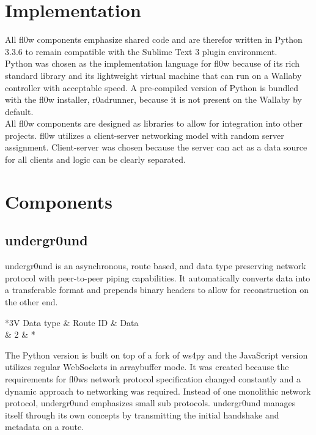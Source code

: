 \documentclass[conference,a4paper]{IEEEtran}
\begin{document}
\section{Implementation}
All fl0w\cite{fl0w:Philip Trauner} components emphasize shared code and are therefor written in Python\cite{Python:Python Foundation} 3.3.6 to remain compatible with the Sublime Text 3\cite{Sublime Text 3:Sublime HQ} plugin environment. \\Python was chosen as the implementation language for fl0w because of its rich standard library and its lightweight virtual machine that can run on a Wallaby\cite{Wallaby Controller:KIPR} controller with acceptable speed. A pre-compiled version of Python is bundled with the fl0w installer, r0adrunner, because it is not present on the Wallaby by default. \\All fl0w components are designed as libraries to allow for integration into other projects. fl0w utilizes a client-server networking model with random server assignment. Client-server was chosen because the server can act as a data source for all clients and logic can be clearly separated.

\section{Components}

\subsection{undergr0und}
undergr0und\cite{undergr0und:Philip Trauner} is an asynchronous, route based, and data type preserving network protocol with peer-to-peer piping capabilities.
It automatically converts data into a transferable format and prepends binary headers to allow for reconstruction on the other end.

\begin{table}[H]
\caption{The binary encoding of messages in undergr0und (in bytes)}
\centering
	\begin{tabular}{*{3}{V}}
		Data type & Route ID & Data \\  & 2 & * \\
	\end{tabular}
\label{fig:undergr0und_header}
\end{table}


The Python\cite{Python:Python Foundation} version is built on top of a fork of ws4py\cite{ws4py:Philip Trauner} and the JavaScript\cite{ECMAScript:Ecma} version utilizes regular WebSockets\cite{The WebSocket Protocol:A. Melnikov} in arraybuffer mode. It was created because the requirements for fl0ws\cite{fl0w:Philip Trauner} network protocol specification changed constantly and a dynamic approach to networking was required. Instead of one monolithic network protocol, undergr0und emphasizes small sub protocols. undergr0und manages itself through its own concepts by transmitting the initial handshake and metadata on a route.\\
\end{document}
